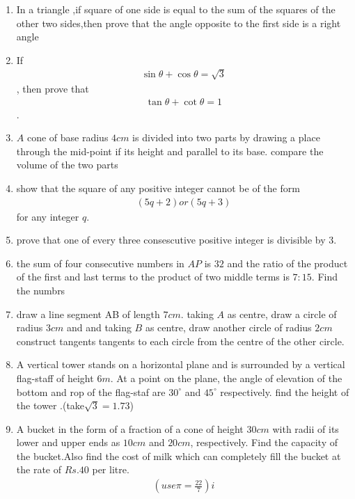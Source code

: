 \documentclass[12pt,-letter paper]{article}
\providecommand{\brak}[1]{\ensuremath{\left(#1\right)}i}
\begin{document}
\begin{enumerate}
       \item In a triangle ,if square of one side is equal to the sum of the squares of the other two sides,then prove that the angle opposite to the first side is a right angle
       \item If \begin{align}\sin \theta + \cos \theta = \sqrt{3}\end{align}, then prove that \begin{align}\tan \theta + \cot \theta = 1\end{align}.
       \item $A$ cone of base radius $4cm$ is divided into two parts by drawing a place through the mid-point if its height and parallel to its base. compare the volume of the two parts 
       \item show that the square of any positive integer cannot be of the form \begin{align}(5q+2) or (5q+3)\end{align} for any integer $q$.
       \item prove that one of every  three consescutive positive integer is divisible by $3$.
       \item the sum of four consecutive numbers in $AP$ is $32$ and the ratio of the product of the first and last terms to the product of two middle terms is $7:15$. Find the numbrs 
       \item draw a line segment AB of length $7cm$. taking $A$ as centre, draw a circle of radius $3cm$ and and taking $B$ as centre, draw another circle of radius $2cm$ construct tangents tangents to each circle from the centre of the other circle.
       \item A vertical tower stands on a horizontal plane and is surrounded by a vertical flag-staff of height $6m$. At a point on the plane, the angle of elevation of the bottom and rop of the flag-staf are $30^\circ$ and $45^\circ$ respectively. find the height of the tower .(take$\sqrt{3}=1.73$)
       \item A bucket in the form of a fraction of a cone of height $30cm$ with radii of its lower and upper ends as $10cm$ and $20cm$, respectively. Find the capacity of the bucket.Also find the cost of milk which can completely fill the bucket at the rate of $Rs.40$ per litre. \begin{align}\brak {use\pi=\frac{22}{7}}\end{align}



\end{enumerate}
\end{document}

